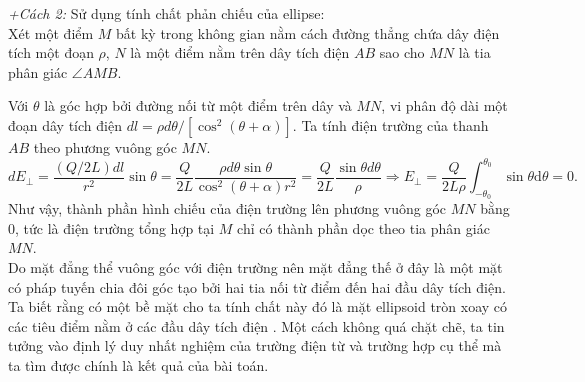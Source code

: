 \textit{+Cách 2:} Sử dụng tính chất phản chiếu của ellipse: \\
Xét một điểm $M$ bất kỳ trong không gian nằm cách đường thẳng chứa dây điện tích một đoạn $\rho$, $N$ là một điểm nằm trên dây tích điện $AB$ sao cho $MN$ là tia phân giác $\angle AMB$.

\begin{center}

\end{center}


Với $\theta$ là góc hợp bởi đường nối từ một điểm trên dây và $MN$, vi phân độ dài một đoạn dây tích điện $dl=\rho d\theta /[\cos^2(\theta+\alpha)]$.
Ta tính điện trường của thanh $AB$ theo phương vuông góc $MN$. 
\begin{equation} \label{eq6_ellipsoid_conductor}
    dE_{\perp}= \dfrac{(Q/2L)dl}{r^2} \sin \theta = \dfrac{Q}{2L} \dfrac{ \rho d\theta \sin\theta}{\cos^2(\theta+\alpha) r^2}= \dfrac{Q}{2L} \dfrac{ \sin\theta d\theta}{\rho} \Rightarrow E_{\perp}=\dfrac{Q}{2L\rho}\int_{-\theta_0}^{\theta_0}\sin\theta\mathrm d\theta=0.
\end{equation}
Như vậy, thành phần hình chiếu của điện trường lên phương vuông góc $MN$ bằng $0$, tức là điện trường tổng hợp tại $M$ chỉ có thành phần dọc theo tia phân giác $MN$. \\
Do mặt đẳng thể vuông góc với điện trường nên mặt đẳng thế ở đây là một mặt có pháp tuyến chia đôi góc tạo bởi hai tia nối từ điểm đến hai đầu dây tích điện. Ta biết rằng có một bề mặt cho ta tính chất này đó là mặt ellipsoid tròn xoay có các tiêu điểm nằm ở các đầu dây tích điện \cite{doi:10.4169/math.mag.87.4.276}. Một cách không quá chặt chẽ, ta tin tưởng vào định lý duy nhất nghiệm của trường điện từ và trường hợp cụ thể mà ta tìm được chính là kết quả của bài toán.

